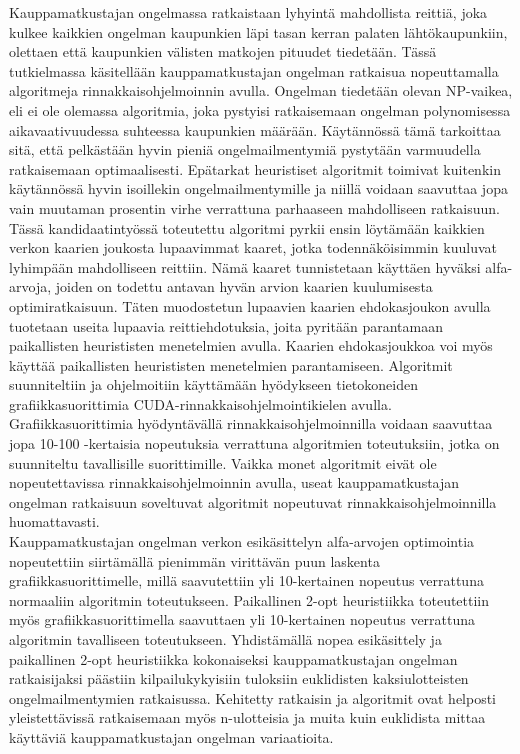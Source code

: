 \documentclass[english, 12pt, a4paper, sci, utf8, a-1b, online]{aaltothesis}
\begin{document}
\begin{abstractpage}[finnish]
Kauppamatkustajan ongelmassa ratkaistaan lyhyintä mahdollista reittiä, joka kulkee kaikkien ongelman kaupunkien läpi tasan kerran palaten lähtökaupunkiin, olettaen että kaupunkien välisten matkojen pituudet tiedetään. Tässä tutkielmassa käsitellään kauppamatkustajan ongelman ratkaisua nopeuttamalla algoritmeja rinnakkaisohjelmoinnin avulla.  Ongelman tiedetään olevan NP-vaikea, eli ei ole olemassa algoritmia, joka pystyisi ratkaisemaan ongelman polynomisessa aikavaativuudessa suhteessa kaupunkien määrään. Käytännössä tämä tarkoittaa sitä, että pelkästään hyvin pieniä ongelmailmentymiä pystytään varmuudella ratkaisemaan optimaalisesti. Epätarkat heuristiset algoritmit toimivat kuitenkin käytännössä hyvin isoillekin ongelmailmentymille ja niillä voidaan saavuttaa jopa vain muutaman prosentin virhe verrattuna parhaaseen mahdolliseen ratkaisuun. \\

Tässä kandidaatintyössä toteutettu algoritmi pyrkii ensin löytämään kaikkien verkon kaarien joukosta lupaavimmat kaaret, jotka todennäköisimmin kuuluvat lyhimpään mahdolliseen reittiin. Nämä kaaret tunnistetaan käyttäen hyväksi alfa-arvoja, joiden on todettu antavan hyvän arvion kaarien kuulumisesta optimiratkaisuun.  Täten muodostetun lupaavien kaarien ehdokasjoukon avulla tuotetaan useita lupaavia reittiehdotuksia, joita pyritään parantamaan paikallisten heurististen menetelmien avulla. Kaarien ehdokasjoukkoa voi myös käyttää paikallisten heurististen menetelmien parantamiseen. Algoritmit suunniteltiin ja ohjelmoitiin käyttämään hyödykseen tietokoneiden grafiikkasuorittimia CUDA-rinnakkaisohjelmointikielen avulla. Grafiikkasuorittimia hyödyntävällä rinnakkaisohjelmoinnilla voidaan saavuttaa jopa 10-100 -kertaisia nopeutuksia verrattuna algoritmien toteutuksiin, jotka on suunniteltu tavallisille suorittimille. Vaikka monet algoritmit eivät ole nopeutettavissa rinnakkaisohjelmoinnin avulla, useat kauppamatkustajan ongelman ratkaisuun soveltuvat algoritmit nopeutuvat rinnakkaisohjelmoinnilla huomattavasti. \\

Kauppamatkustajan ongelman verkon esikäsittelyn alfa-arvojen optimointia nopeutettiin siirtämällä pienimmän virittävän puun laskenta grafiikkasuorittimelle, millä saavutettiin yli 10-kertainen nopeutus verrattuna normaaliin algoritmin toteutukseen. Paikallinen 2-opt heuristiikka toteutettiin myös grafiikkasuorittimella saavuttaen yli 10-kertainen nopeutus verrattuna algoritmin tavalliseen toteutukseen. Yhdistämällä nopea esikäsittely ja paikallinen 2-opt heuristiikka kokonaiseksi kauppamatkustajan ongelman ratkaisijaksi päästiin kilpailukykyisiin tuloksiin euklidisten kaksiulotteisten ongelmailmentymien ratkaisussa. Kehitetty ratkaisin ja algoritmit ovat helposti yleistettävissä ratkaisemaan myös n-ulotteisia ja muita kuin euklidista mittaa käyttäviä kauppamatkustajan ongelman variaatioita.
\end{abstractpage}
\end{document}
